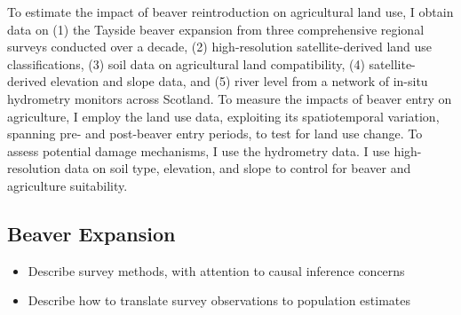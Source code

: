 To estimate the impact of beaver reintroduction on agricultural land use, I obtain data on (1) the Tayside beaver expansion from three comprehensive regional surveys conducted over a decade, (2) high-resolution satellite-derived land use classifications, (3) soil data on agricultural land compatibility, (4) satellite-derived elevation and slope data, and (5) river level from a network of in-situ hydrometry monitors across Scotland. To measure the impacts of beaver entry on agriculture, I employ the land use data, exploiting its spatiotemporal variation, spanning pre- and post-beaver entry periods, to test for land use change. To assess potential damage mechanisms, I use the hydrometry data. I use high-resolution data on soil type, elevation, and slope to control for beaver and agriculture suitability.

\subsection{Beaver Expansion}
\begin{itemize}
    \item Describe survey methods, with attention to causal inference concerns
    \item Describe how to translate survey observations to population estimates
\end{itemize}

